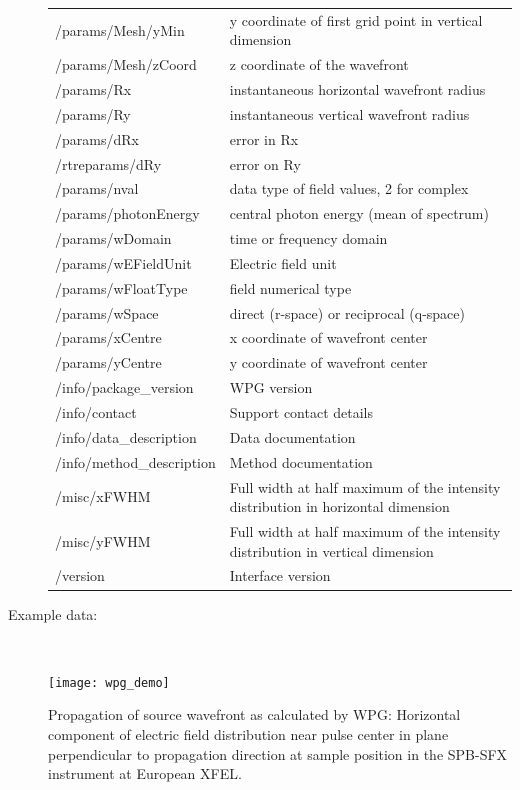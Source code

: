 \documentclass[12pt]{scrartcl}
\begin{document}
\begin{description}
{\begin{tabular}{l|l}
  /params/Mesh/yMin     & y coordinate of first grid point in vertical dimension \\
  /params/Mesh/zCoord     & z coordinate of the wavefront \\
  /params/Rx    &  instantaneous horizontal wavefront radius\\
  /params/Ry    &  instantaneous vertical wavefront radius\\
  /params/dRx     & error in Rx \\
  /rtreparams/dRy     & error on Ry \\
  /params/nval    &  data type of field values, 2 for complex \\
  /params/photonEnergy    & central photon energy (mean of spectrum) \\
  /params/wDomain     & time or frequency domain\\
  /params/wEFieldUnit     & Electric field unit \\
  /params/wFloatType    &  field numerical type \\
  /params/wSpace    &  direct (r-space) or reciprocal (q-space)\\
  /params/xCentre     & x coordinate of wavefront center \\
  /params/yCentre                 & y coordinate of wavefront center \\
  /info/package\_version          & WPG version \\
  /info/contact        & Support contact details \\
  /info/data\_description         & Data documentation \\
  /info/method\_description       & Method documentation \\
  /misc/xFWHM        & Full width at half maximum of the intensity distribution in horizontal dimension\\
  /misc/yFWHM        & Full width at half maximum of the intensity distribution in
  vertical dimension\\
  /version        & Interface version \\
  \hline
  \hline
\end{tabular}
}
\item[Example data:]\ \\
      \begin{center}
        \texttt{[image: wpg\_demo]}
      \end{center}
      \scriptsize{Propagation of source wavefront as calculated by WPG: Horizontal
      component of electric field distribution near pulse center in plane perpendicular to
    propagation direction at sample position in the SPB-SFX instrument at
    European XFEL.}
\end{description}
\end{document}
